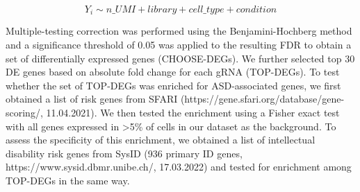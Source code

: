 \[Y_i \sim n\_UMI + library + cell\_type + condition \]

Multiple-testing correction was performed using the Benjamini-Hochberg method and a significance threshold of 0.05 was applied to the resulting FDR to obtain a set of differentially expressed genes (CHOOSE-DEGs).  We further selected top 30 DE genes based on absolute fold change for each gRNA (TOP-DEGs). To test whether the set of TOP-DEGs was enriched for ASD-associated genes, we first obtained a list of risk genes from SFARI (https://gene.sfari.org/database/gene-scoring/, 11.04.2021). We then tested the enrichment using a Fisher exact test with all genes expressed in >5\% of cells in our dataset as the background. To assess the specificity of this enrichment, we obtained a list of intellectual disability risk genes from SysID (936 primary ID genes, https://www.sysid.dbmr.unibe.ch/, 17.03.2022) and tested for enrichment among TOP-DEGs in the same way.

